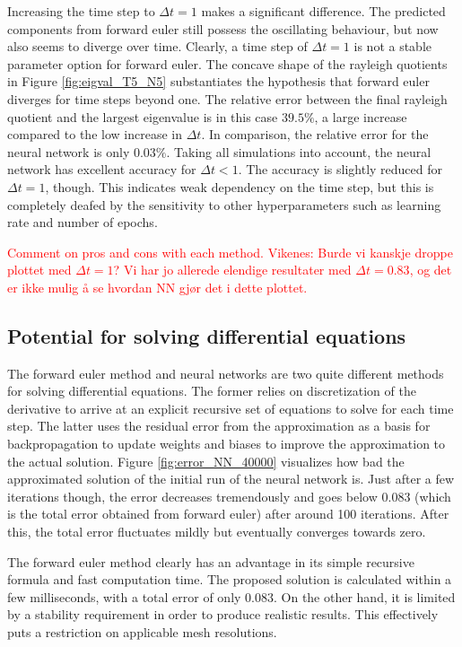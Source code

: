 \documentclass[12pt]{extarticle}
\begin{document}
Increasing the time step to $\Delta t = 1$ makes a significant difference. The predicted components from forward euler still possess the oscillating behaviour, but now also seems to diverge over time. Clearly, a time step of $\Delta t=1$ is not a stable parameter option for forward euler. The concave shape of the rayleigh quotients in Figure \ref{fig:eigval_T5_N5} substantiates the hypothesis that forward euler diverges for time steps beyond one. The relative error between the final rayleigh quotient and the largest eigenvalue is in this case $39.5\%$, a large increase compared to the low increase in $\Delta t$. In comparison, the relative error for the neural network is only $0.03\%$. Taking all simulations into account, the neural network has excellent accuracy for $\Delta t < 1$. The accuracy is slightly reduced for $\Delta t = 1$, though. This indicates weak dependency on the time step, but this is completely deafed by the sensitivity to other hyperparameters such as learning rate and number of epochs.

\textcolor{red}{Comment on pros and cons with each method.}
\textcolor{red}{Vikenes: Burde vi kanskje droppe plottet med $\Delta t=1$? Vi har jo allerede elendige resultater med $\Delta t=0.83$, og det er ikke mulig å se hvordan NN gjør det i dette plottet.}




\subsection*{Potential for solving differential equations}
The forward euler method and neural networks are two quite different methods for solving differential equations. The former relies on discretization of the derivative to arrive at an explicit recursive set of equations to solve for each time step. The latter uses the residual error from the approximation as a basis for backpropagation to update weights and biases to improve the approximation to the actual solution. Figure \ref{fig:error_NN_40000} visualizes how bad the approximated solution of the initial run of the neural network is. Just after a few iterations though, the error decreases tremendously and goes below 0.083 (which is the total error obtained from forward euler) after around 100 iterations. After this, the total error fluctuates mildly but eventually converges towards zero.
 
\par The forward euler method clearly has an advantage in its simple recursive formula and fast computation time. The proposed solution is calculated within a few milliseconds, with a total error of only 0.083. On the other hand, it is limited by a stability requirement in order to produce realistic results. This effectively puts a restriction on applicable mesh resolutions.
\end{document}
